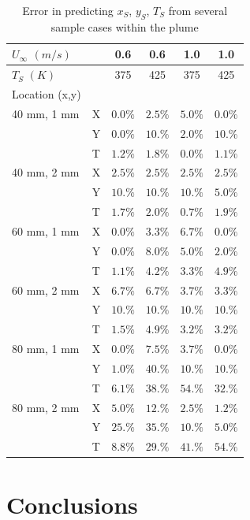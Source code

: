 \documentclass[preprint,12pt]{elsarticle}
\begin{document}
\begin{table}[!h!t!b!p]
\begin{center}
\begin{tabular}{ l | l c c c c}
 $U_{\infty}$ $(m/s)$ & & 0.6 & 0.6 & 1.0 & 1.0 \\ \hline
 $T_S$ $(K)$ & & 375 & 425 & 375 & 425  \\ \hline \hline
 Location (x,y) & \\
 40 mm, 1 mm & X & $0.0\%$ & $2.5\%$ & $5.0\%$ & $0.0\%$ \\
 						 & Y & $0.0\%$ & $10.\%$ & $2.0\%$ & $10.\%$ \\
 						 & T & $1.2\%$ & $1.8\%$ & $0.0\%$ & $1.1\%$ \\ \hline
 40 mm, 2 mm & X & $2.5\%$ & $2.5\%$ & $2.5\%$ & $2.5\%$ \\ 
 						 & Y & $10.\%$ & $10.\%$ & $10.\%$ & $5.0\%$ \\ 
 						 & T & $1.7\%$ & $2.0\%$ & $0.7\%$ & $1.9\%$ \\ \hline
 60 mm, 1 mm & X & $0.0\%$ & $3.3\%$ & $6.7\%$ & $0.0\%$ \\ 
						 & Y & $0.0\%$ & $8.0\%$ & $5.0\%$ & $2.0\%$ \\ 
						 & T & $1.1\%$ & $4.2\%$ & $3.3\%$ & $4.9\%$ \\ \hline
 60 mm, 2 mm & X & $6.7\%$ & $6.7\%$ & $3.7\%$ & $3.3\%$ \\ 
   					 & Y & $10.\%$ & $10.\%$ & $10.\%$ & $10.\%$ \\ 
   					 & T & $1.5\%$ & $4.9\%$ & $3.2\%$ & $3.2\%$ \\ \hline
 80 mm, 1 mm & X & $0.0\%$ & $7.5\%$ & $3.7\%$ & $0.0\%$ \\ 
  					 & Y & $1.0\%$ & $40.\%$ & $10.\%$ & $10.\%$ \\ 
  					 & T & $6.1\%$ & $38.\%$ & $54.\%$ & $32.\%$ \\ \hline
 80 mm, 2 mm & X & $5.0\%$ & $12.\%$ & $2.5\%$ & $1.2\%$ \\ 
 						 & Y & $25.\%$ & $35.\%$ & $10.\%$ & $5.0\%$ \\ 
 						 & T & $8.8\%$ & $29.\%$ & $41.\%$ & $54.\%$ \\ \hline
 \end{tabular}
\caption{Error in predicting $x_S$, $y_S$, $T_S$ from several sample cases within the plume}
\label{tab:typeE}
\end{center}
\end{table}


\section{Conclusions}
\end{document}
